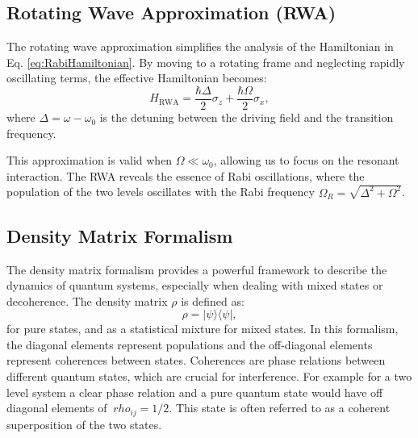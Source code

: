 
\subsection{Rotating Wave Approximation (RWA)}

The rotating wave approximation simplifies the analysis of the Hamiltonian in Eq. \eqref{eq:RabiHamiltonian}. By moving to a rotating frame and neglecting rapidly oscillating terms, the effective Hamiltonian becomes:
\begin{equation}
    H_{\text{RWA}} = \frac{\hbar \Delta}{2} \sigma_z + \frac{\hbar \Omega}{2} \sigma_x,
    \label{eq:RWAHamiltonian}
\end{equation}
where \(\Delta = \omega - \omega_0\) is the detuning between the driving field and the transition frequency.

This approximation is valid when \(\Omega \ll \omega_0\), allowing us to focus on the resonant interaction. The RWA reveals the essence of Rabi oscillations, where the population of the two levels oscillates with the Rabi frequency \(\Omega_R = \sqrt{\Delta^2 + \Omega^2}\).


\subsection{Density Matrix Formalism}

The density matrix formalism provides a powerful framework to describe the dynamics of quantum systems, especially when dealing with mixed states or decoherence. 
The density matrix \(\rho\) is defined as:
\begin{equation}
    \rho = |\psi\rangle \langle \psi|,
    \label{eq:DensityMatrix}
\end{equation}
for pure states, and as a statistical mixture for mixed states.
In this formalism, the diagonal elements represent populations and the off-diagonal elements represent coherences between states.
Coherences are phase relations between different quantum states, which are crucial for interference.
For example for a two level system a clear phase relation and a pure quantum state would have off diagonal elements of $ \ rho_{ij} = 1/2$.
This state is often referred to as a coherent superposition of the two states.

